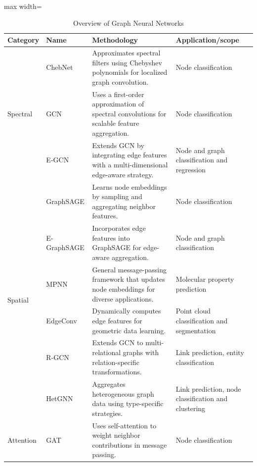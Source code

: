 \documentclass[journal]{IEEEtran}
\begin{document}
\begin{table}[htbp]
  \centering
  \caption{Overview of Graph Neural Networks}
  \label{tab:gnn_overview_final}
  \renewcommand{\arraystretch}{1.2}
  \begin{adjustbox}{max width=\textwidth}
    \begin{tabular}{p{2cm}lp{9cm}p{3.5cm}}
      \toprule
      \textbf{Category} & \textbf{Name} & \textbf{Methodology} & \textbf{Application/scope} 
      \\
      \midrule
      \multirow{3}{*}{Spectral} 
        & ChebNet \cite{defferrard2016convolutional}   & Approximates spectral filters using Chebyshev polynomials for localized graph convolution. & Node classification \\ 
        & GCN \cite{kipf2016semi} & Uses a first-order approximation of spectral convolutions for scalable feature aggregation. & Node classification  \\ 
        & E-GCN \cite{gong2019exploiting}& Extends GCN by integrating edge features with a multi-dimensional edge-aware strategy. & Node and graph classification and regression  \\ 
      \midrule
      \multirow{6}{*}{Spatial} 
        & GraphSAGE \cite{hamilton2017inductive} & Learns node embeddings by sampling and aggregating neighbor features. & Node classification \\ 
        & E-GraphSAGE \cite{lo2022graphsage} & Incorporates edge features into GraphSAGE for edge-aware aggregation. & Node and graph classification  \\ 
        & MPNN \cite{gilmer2017neural} & General message-passing framework that updates node embeddings for diverse applications. & Molecular property prediction  \\ 
        & EdgeConv \cite{wang2019dynamic} & Dynamically computes edge features for geometric data learning. & Point cloud classification and segmentation \\ 
        & R-GCN \cite{schlichtkrull2018modeling} & Extends GCN to multi-relational graphs with relation-specific transformations. & Link prediction, entity classification \\ 
        & HetGNN \cite{zhang2019heterogeneous}  & Aggregates heterogeneous graph data using type-specific strategies. & Link prediction, node classification and clustering \\ 
      \midrule
      \multirow{2}{*}{Attention} 
        & GAT \cite{velivckovic2017graph} & Uses self-attention to weight neighbor contributions in message passing. & Node classification  \\ 

\end{tabular}
\end{adjustbox}
\end{table}
\end{document}
